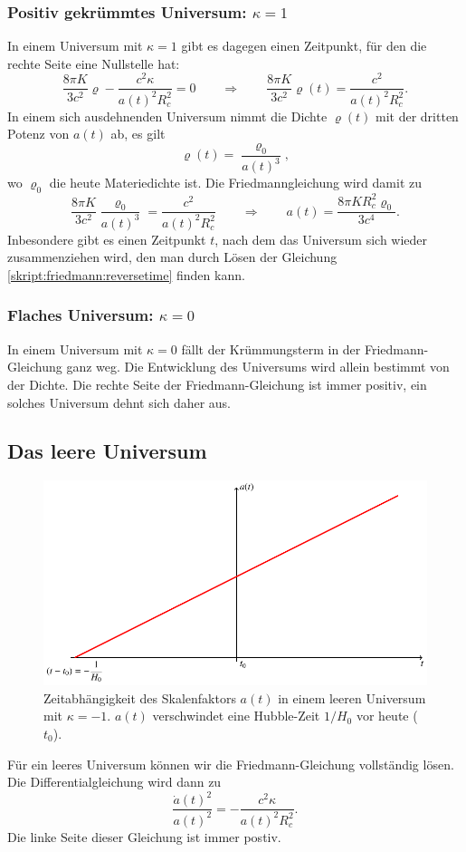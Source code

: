 \subsubsection{Positiv gekrümmtes Universum: $\kappa=1$}
In einem Universum mit $\kappa=1$ gibt es dagegen einen Zeitpunkt, für
den die rechte Seite eine Nullstelle hat:
\[
\frac{8\pi K}{3c^2}\varrho -\frac{c^2\kappa}{a(t)^2R_c^2}=0
\qquad\Rightarrow\qquad
\frac{8\pi K}{3c^2}\varrho(t)=\frac{c^2}{a(t)^2R_c^2}.
\]
In einem sich ausdehnenden Universum nimmt die Dichte $\varrho(t)$ mit
der dritten Potenz von $a(t)$ ab, es gilt
\[
\varrho(t) = \frac{\varrho_0}{a(t)^3},
\]
wo $\varrho_0$ die heute Materiedichte ist.
Die Friedmanngleichung wird damit zu
\begin{equation}
\frac{8\pi K}{3c^2}\frac{\varrho_0}{a(t)^3}=\frac{c^2}{a(t)^2R_c^2}
\qquad\Rightarrow\qquad
a(t)
=
\frac{8\pi K R_c^2\varrho_0}{3c^4}.
\label{skript:friedmann:reversetime}
\end{equation}
Inbesondere gibt es einen Zeitpunkt $t$, nach dem das Universum sich
wieder zusammenziehen wird, den man durch Lösen der Gleichung
\eqref{skript:friedmann:reversetime}
finden kann.

\subsubsection{Flaches Universum: $\kappa=0$}
In einem Universum mit $\kappa=0$ fällt der Krümmungsterm in 
der Friedmann-Gleichung ganz weg.
Die Entwicklung des Universums wird allein bestimmt von der Dichte.
Die rechte Seite der Friedmann-Gleichung ist immer positiv, ein
solches Universum dehnt sich daher aus.

\subsection{Das leere Universum}
\begin{figure}
\centering
\includegraphics{chapters/tikz/friedmann-leer.pdf}
\caption{Zeitabhängigkeit des Skalenfaktors $a(t)$ in einem leeren
Universum mit $\kappa = -1$.
$a(t)$ verschwindet eine Hubble-Zeit $1/H_0$ vor heute ($t_0$).
\label{chapter:friedmann:graph:leer}}
\end{figure}
Für ein leeres Universum können wir die Friedmann-Gleichung vollständig
lösen.
Die Differentialgleichung wird dann zu
\[
\frac{\dot a(t)^2}{a(t)^2}
=
-\frac{c^2\kappa}{a(t)^2R_c^2}.
\]
Die linke Seite dieser Gleichung ist immer postiv.

